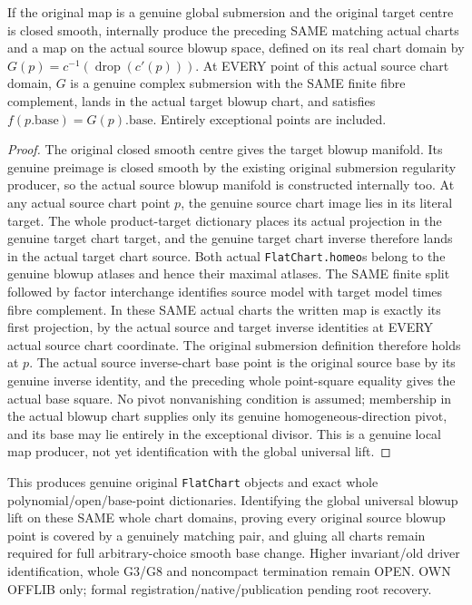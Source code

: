 \begin{theorem}
\label{hir:submersion-adapted-blowup-actual-smooth-chart-map}
\leanok
{}

If the original map is a genuine global submersion and the original target centre is closed smooth, internally produce the preceding SAME matching actual charts and a map on the actual source blowup space, defined on its real chart domain by $G(p)=c^{-1}(\operatorname{drop}(c'(p)))$. At EVERY point of this actual source chart domain, $G$ is a genuine complex submersion with the SAME finite fibre complement, lands in the actual target blowup chart, and satisfies $f(p.\mathrm{base})=G(p).\mathrm{base}$. Entirely exceptional points are included.
\end{theorem}
\begin{proof}
The original closed smooth centre gives the target blowup manifold. Its genuine preimage is closed smooth by the existing original submersion regularity producer, so the actual source blowup manifold is constructed internally too. At any actual source chart point $p$, the genuine source chart image lies in its literal target. The whole product-target dictionary places its actual projection in the genuine target chart target, and the genuine target chart inverse therefore lands in the actual target chart source. Both actual \texttt{FlatChart.homeo}s belong to the genuine blowup atlases and hence their maximal atlases. The SAME finite split followed by factor interchange identifies source model with target model times fibre complement. In these SAME actual charts the written map is exactly its first projection, by the actual source and target inverse identities at EVERY actual source chart coordinate. The original submersion definition therefore holds at $p$. The actual source inverse-chart base point is the original source base by its genuine inverse identity, and the preceding whole point-square equality gives the actual base square. No pivot nonvanishing condition is assumed; membership in the actual blowup chart supplies only its genuine homogeneous-direction pivot, and its base may lie entirely in the exceptional divisor. This is a genuine local map producer, not yet identification with the global universal lift.
\end{proof}

This produces genuine original \texttt{FlatChart} objects and exact whole polynomial/open/base-point dictionaries. Identifying the global universal blowup lift on these SAME whole chart domains, proving every original source blowup point is covered by a genuinely matching pair, and gluing all charts remain required for full arbitrary-choice smooth base change. Higher invariant/old driver identification, whole G3/G8 and noncompact termination remain OPEN. OWN OFFLIB only; formal registration/native/publication pending root recovery.

